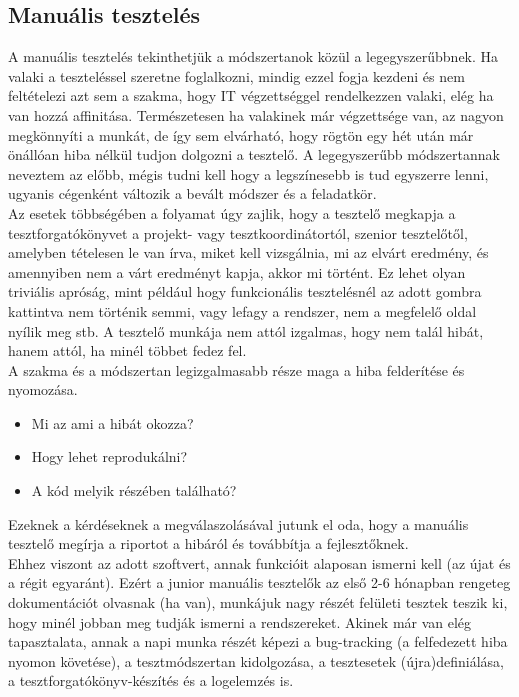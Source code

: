 \subsection{Manuális tesztelés} A manuális tesztelés tekinthetjük a módszertanok közül a legegyszerűbbnek. Ha valaki a teszteléssel szeretne foglalkozni, mindig ezzel fogja kezdeni és nem feltételezi azt sem a szakma, hogy IT végzettséggel rendelkezzen valaki, elég ha van hozzá affinitása. Természetesen ha valakinek már végzettsége van, az nagyon megkönnyíti a munkát, de így sem elvárható, hogy rögtön egy hét után már önállóan hiba nélkül tudjon dolgozni a tesztelő. A legegyszerűbb módszertannak neveztem az előbb, mégis tudni kell hogy a legszínesebb is tud egyszerre lenni, ugyanis cégenként változik a bevált módszer és a feladatkör.\\
Az esetek többségében a folyamat úgy zajlik, hogy a tesztelő megkapja a tesztforgatókönyvet a projekt- vagy tesztkoordinátortól, szenior tesztelőtől, amelyben tételesen le van írva, miket kell vizsgálnia, mi az elvárt eredmény, és amennyiben nem a várt eredményt kapja, akkor mi történt. Ez lehet olyan triviális apróság, mint például hogy funkcionális tesztelésnél az adott gombra kattintva nem történik semmi, vagy lefagy a rendszer, nem a megfelelő oldal nyílik meg stb. A tesztelő munkája nem attól izgalmas, hogy nem talál hibát, hanem attól, ha minél többet fedez fel.\cite{computerworld}\\
A szakma és a módszertan legizgalmasabb része maga a hiba felderítése és nyomozása. 
\begin{itemize}
\item Mi az ami a hibát okozza?
\item Hogy lehet reprodukálni?
\item A kód melyik részében található?
\end{itemize}
Ezeknek a kérdéseknek a megválaszolásával jutunk el oda, hogy a manuális tesztelő megírja a riportot a hibáról és továbbítja a fejlesztőknek.\\
Ehhez viszont az adott szoftvert, annak funkcióit alaposan ismerni kell (az újat és a régit egyaránt). Ezért a junior manuális tesztelők az első 2-6 hónapban rengeteg dokumentációt olvasnak (ha van), munkájuk nagy részét felületi tesztek teszik ki, hogy minél jobban meg tudják ismerni a rendszereket. Akinek már van elég tapasztalata, annak a napi munka részét képezi a bug-tracking (a felfedezett hiba nyomon követése), a tesztmódszertan kidolgozása, a tesztesetek (újra)definiálása, a tesztforgatókönyv-készítés és a logelemzés is.\cite{computerworld}


